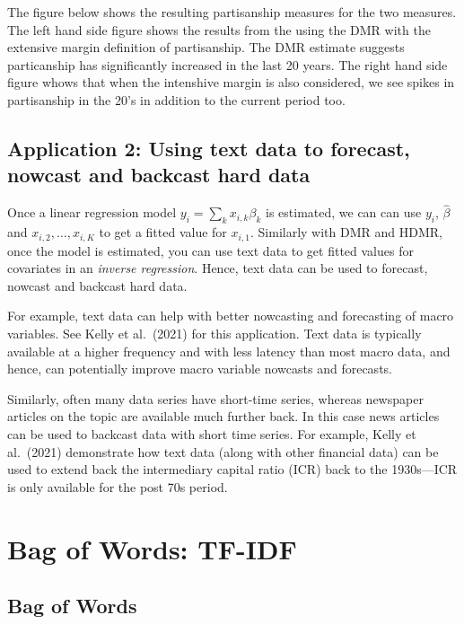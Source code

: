 \documentclass[
]{book}
\begin{document}
The figure below shows the resulting partisanship measures for the two measures. The left hand side figure shows the results from the using the DMR with the extensive margin definition of partisanship. The DMR estimate suggests particanship has significantly increased in the last 20 years. The right hand side figure whows that when the intenshive margin is also considered, we see spikes in partisanship in the 20's in addition to the current period too.

\hypertarget{application-2-using-text-data-to-forecast-nowcast-and-backcast-hard-data}{%
\section{Application 2: Using text data to forecast, nowcast and backcast hard data}\label{application-2-using-text-data-to-forecast-nowcast-and-backcast-hard-data}}

Once a linear regression model \(y_i = \sum_{k} x_{i,k}\beta_k\) is estimated, we can can use \(y_i\), \(\hat \beta\) and \(x_{i,2},\dots, x_{i,K}\) to get a fitted value for \(x_{i,1}\). Similarly with DMR and HDMR, once the model is estimated, you can use text data to get fitted values for covariates in an \emph{inverse regression}. Hence, text data can be used to forecast, nowcast and backcast hard data.

For example, text data can help with better nowcasting and forecasting of macro variables. See Kelly et al.~(2021) for this application. Text data is typically available at a higher frequency and with less latency than most macro data, and hence, can potentially improve macro variable nowcasts and forecasts.

Similarly, often many data series have short-time series, whereas newspaper articles on the topic are available much further back. In this case news articles can be used to backcast data with short time series. For example, Kelly et al.~(2021) demonstrate how text data (along with other financial data) can be used to extend back the intermediary capital ratio (ICR) back to the 1930s---ICR is only available for the post 70s period.

\hypertarget{bag-of-words-tf-idf}{%
\chapter{Bag of Words: TF-IDF}\label{bag-of-words-tf-idf}}

\hypertarget{bag-of-words}{%
\section{Bag of Words}\label{bag-of-words}}
\end{document}
